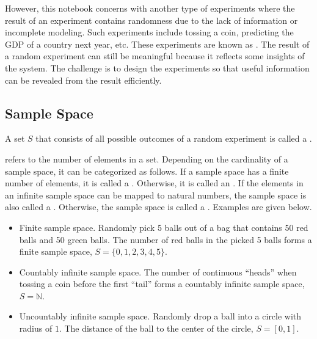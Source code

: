However, this notebook concerns with another type of experiments where the result of an experiment contains randomness due to the lack of information or incomplete modeling. Such experiments include tossing a coin, predicting the GDP of a country next year, etc. These experiments are known as . The result of a random experiment can still be meaningful because it reflects some insights of the system. The challenge is to design the experiments so that useful information can be revealed from the result efficiently.

\subsection{Sample Space}

A set $S$ that consists of all possible outcomes of a random experiment is called a .

 refers to the number of elements in a set. Depending on the cardinality of a sample space, it can be categorized as follows. If a sample space has a finite number of elements, it is called a . Otherwise, it is called an . If the elements in an infinite sample space can be mapped to natural numbers, the sample space is also called a . Otherwise, the sample space is called a . Examples are given below.
\begin{itemize}
	\item Finite sample space. Randomly pick 5 balls out of a bag that contains 50 red balls and 50 green balls. The number of red balls in the picked 5 balls forms a finite sample space, $S = \{0, 1, 2, 3, 4, 5\}$.
	\item Countably infinite sample space. The number of continuous ``heads'' when tossing a coin before the first ``tail'' forms a countably infinite sample space, $S = \mathbb{N}$.
	\item Uncountably infinite sample space. Randomly drop a ball into a circle with radius of $1$. The distance of the ball to the center of the circle, $S=[0,1]$.
\end{itemize}

